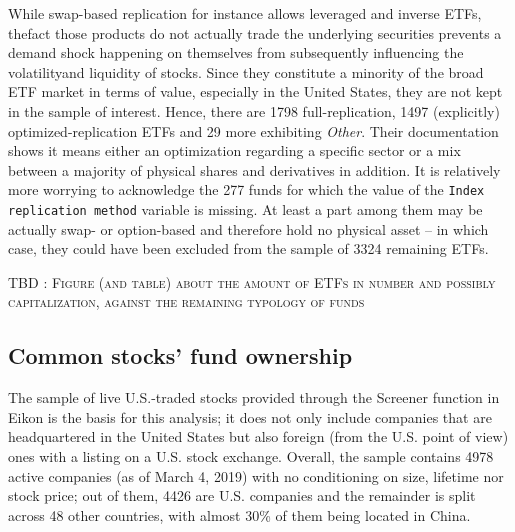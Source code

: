 While swap-based replication for instance allows leveraged and inverse ETFs, thefact those products do not actually trade the underlying securities prevents a demand shock happening on themselves from subsequently influencing the volatilityand liquidity of stocks. Since they constitute a minority of the broad ETF market in terms of value, especially in the United States, they are not kept in the sample of interest. Hence, there are 1798 full-replication, 1497 (explicitly) optimized-replication ETFs and 29 more exhibiting \textit{Other}. Their documentation shows it means either an optimization regarding a specific sector or a mix between a majority of physical shares and derivatives in addition. It is relatively more worrying to acknowledge the 277 funds for which the value of the \texttt{Index replication method} variable is missing. At least a part among them may be actually swap- or option-based and therefore hold no physical asset -- in which case, they could have been excluded from the sample of 3324 remaining ETFs.

\begin{center}
  \textsc{TBD : Figure (and table) about the amount of ETFs in number and possibly capitalization, against the remaining typology of funds}
  \end{center}
\subsection{Common stocks' fund ownership}
The sample of live U.S.-traded stocks provided through the Screener function in Eikon is the basis for this analysis; it does not only include companies that are headquartered in the United States but also foreign (from the U.S. point of view) ones with a listing on a U.S. stock exchange. Overall, the sample contains 4978 active companies (as of March 4, 2019) with no conditioning on size, lifetime nor stock price; out of them, 4426 are U.S. companies and the remainder is split across 48 other countries, with almost 30\% of them being located in China.

